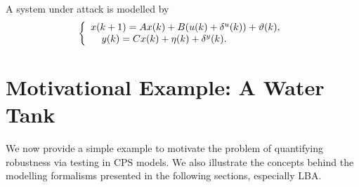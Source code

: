 {%
A system under attack is modelled by
\begin{equation}
\left\{
\begin{array}{ll}
{x}({k+1}) = A x(k) + B (u(k) + \delta^u(k)) + \vartheta(k),\label{17} \\
\text{ \ \ }\hspace{.35mm}{y}(k) = C x(k) + \eta(k) + \delta^y(k).
\end{array}
\right.
\end{equation}
}
\section{Motivational Example: A Water Tank}
\label{sec:CPSRobustness:example}
We now provide a simple example to motivate the problem of quantifying robustness via testing in CPS models. We also illustrate the concepts behind the modelling formalisms presented in the following sections, especially LBA.


